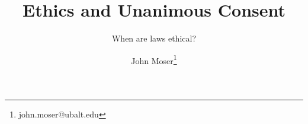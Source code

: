 \documentclass[twoside,notitlepage,12pt,appendixprefix=true]{scrartcl}
\begin{document}
    \author{John Moser\thanks{john.moser@ubalt.edu}}

    \title{Ethics and Unanimous Consent}
    \subtitle{When are laws ethical?}
    \maketitle

    
    \FloatBarrier
    \printbibliography
\end{document}
